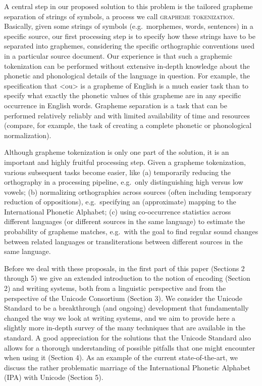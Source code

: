 A central step in our proposed solution to this problem is the tailored grapheme separation of strings of symbols, a process we call \textsc{grapheme tokenization}. Basically, given some strings of symbols (e.g.~morphemes, words, sentences) in a specific source, our first processing step is to specify how these strings have to be separated into graphemes, considering the specific orthographic conventions used in a particular source document. Our experience is that such a graphemic tokenization can be performed without extensive in-depth knowledge about the phonetic and phonological details of the language in question. For example, the specification that <ou> is a grapheme of English is a much easier task than to specify what exactly the phonetic values of this grapheme are in any specific occurrence in English words. Grapheme separation is a task that can be performed relatively reliably and with limited availability of time and resources (compare, for example, the task of creating a complete phonetic or phonological normalization).

Although grapheme tokenization is only one part of the solution, it is an important and highly fruitful processing step. Given a grapheme tokenization, various subsequent tasks become easier, like (a) temporarily reducing the orthography in a processing pipeline, e.g.~only distinguishing high versus low vowels; (b) normalizing orthographies across sources (often including temporary reduction of oppositions), e.g.~specifying an (approximate) mapping to the International Phonetic Alphabet; (c) using co-occurrence statistics across different languages (or different sources in the same language) to estimate the probability of grapheme matches, e.g.~with the goal to find regular sound changes between related languages or transliterations between different sources in the same language.

Before we deal with these proposals, in the first part of this paper (Sections 2 through 5) we give an extended introduction to the notion of encoding (Section 2) and writing systems, both from a linguistic perspective and from the perspective of the Unicode Consortium (Section 3). We consider the Unicode Standard to be a breakthrough (and ongoing) development that fundamentally changed the way we look at writing systems, and we aim to provide here a slightly more in-depth survey of the many techniques that are available in the standard. A good appreciation for the solutions that the Unicode Standard also allows for a thorough understanding of possible pitfalls that one might encounter when using it (Section 4). As an example of the current state-of-the-art, we discuss the rather problematic marriage of the International Phonetic Alphabet (IPA) with Unicode (Section 5).

